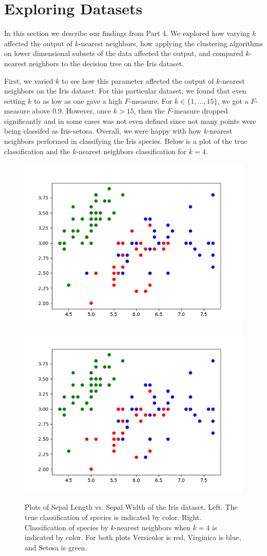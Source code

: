 \documentclass[psamsfonts,onesided,10pt]{amsart}
\begin{document}
\section{Exploring Datasets}
In this section we describe our findings from Part 4. We explored how varying $k$ affected the 
output of $k$-nearest neighbors, how applying the clustering algorithms on lower dimensional 
subsets of the data affected the output, and compared $k$-nearest neighbors to the decision 
tree on the Iris dataset. 

First, we varied $k$ to see how this parameter affected the output of $k$-nearest neighbors on 
the Iris dataset. For this particular dataset, we found that even setting $k$ to as low as one gave 
a high $F$-measure. For $k\in \{1,...,15\}$, we got a $F$-measure above 0.9. However, 
once $k>15$, then the $F$-measure dropped significantly and in some cases was not even 
defined since not many points were being classifed as Iris-setosa. Overall, we were happy with 
how $k$-nearest neighbors performed in classifying the Iris species. Below is a plot of the true 
classification and the $k$-nearest neighbors classification for $k=4$. 

\begin{figure}[H]
    \centering
    {\includegraphics[width=.4\textwidth]{images/trueclass.png}} 
    {\includegraphics[width=.4\textwidth]{images/KNNclass.png}} 
    \caption{Plots of Sepal Length vs. Sepal Width of the Iris dataset. Left. The true classification 
of species is indicated by color. Right. Classification of species by $k$-nearest neighbors when 
$k=4$ is indicated by color. For both plots Versicolor is red, Virginica is blue, and Setosa is green.}
\end{figure}
\end{document}
